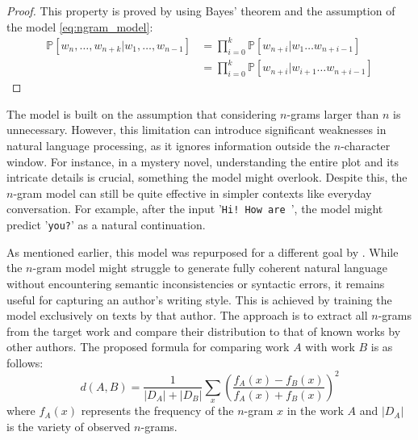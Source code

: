 \begin{proof}
	This property is proved by using Bayes' theorem and the assumption of the model \cref{eq:ngram_model}:
\begin{align*}
	\mathbb{P}\left[w_n,\dots,w_{n+k}|w_1,\dots,w_{n-1}\right] &= \prod_{i=0}^{k}\mathbb{P}\left[w_{n+i}|w_1\dots w_{n+i-1}\right] \\
	&= \prod_{i=0}^{k}\mathbb{P}\left[w_{n+i}|w_{i+1}\dots w_{n+i-1}\right]
\end{align*}
\end{proof}

\noindent The model is built on the assumption that considering $n$-grams larger than $n$ is unnecessary. However, this limitation can introduce significant weaknesses in natural language processing, as it ignores information outside the $n$-character window. For instance, in a mystery novel, understanding the entire plot and its intricate details is crucial, something the model might overlook. Despite this, the $n$-gram model can still be quite effective in simpler contexts like everyday conversation. For example, after the input '\texttt{Hi! How are }', the model might predict '\texttt{you?}' as a natural continuation.

\noindent As mentioned earlier, this model was repurposed for a different goal by \citet{SapAttribution}. While the $n$-gram model might struggle to generate fully coherent natural language without encountering semantic inconsistencies or syntactic errors, it remains useful for capturing an author's writing style. This is achieved by training the model exclusively on texts by that author. The approach is to extract all $n$-grams from the target work and compare their distribution to that of known works by other authors. The proposed formula for comparing work $A$ with work $B$ is as follows:
\begin{equation}
	d(A,B) = \frac{1}{|D_A|+|D_B|}\sum_x\left(\frac{f_A(x)-f_B(x)}{f_A(x)+f_B(x)}\right)^2
	\label{eq:SapAttribution_dist}
\end{equation}
where $f_A(x)$ represents the frequency of the $n$-gram $x$ in the work $A$ and $|D_A|$ is the variety of observed $n$-grams.

